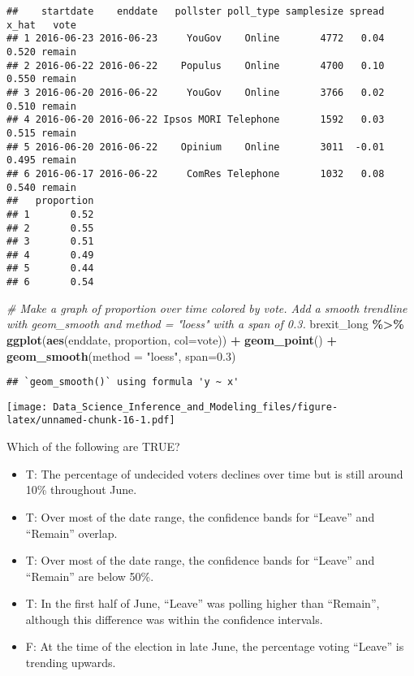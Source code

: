 \documentclass[
]{article}
\newenvironment{Shaded}{\begin{snugshade}}{\end{snugshade}}
\newcommand{\CommentTok}[1]{\textcolor[rgb]{0.56,0.35,0.01}{\textit{#1}}}
\newcommand{\DataTypeTok}[1]{\textcolor[rgb]{0.13,0.29,0.53}{#1}}
\newcommand{\FloatTok}[1]{\textcolor[rgb]{0.00,0.00,0.81}{#1}}
\newcommand{\KeywordTok}[1]{\textcolor[rgb]{0.13,0.29,0.53}{\textbf{#1}}}
\newcommand{\NormalTok}[1]{#1}
\newcommand{\OperatorTok}[1]{\textcolor[rgb]{0.81,0.36,0.00}{\textbf{#1}}}
\newcommand{\StringTok}[1]{\textcolor[rgb]{0.31,0.60,0.02}{#1}}
\providecommand{\tightlist}{%
  \setlength{\itemsep}{0pt}\setlength{\parskip}{0pt}}
\begin{document}
\begin{verbatim}
##    startdate    enddate   pollster poll_type samplesize spread x_hat   vote
## 1 2016-06-23 2016-06-23     YouGov    Online       4772   0.04 0.520 remain
## 2 2016-06-22 2016-06-22    Populus    Online       4700   0.10 0.550 remain
## 3 2016-06-20 2016-06-22     YouGov    Online       3766   0.02 0.510 remain
## 4 2016-06-20 2016-06-22 Ipsos MORI Telephone       1592   0.03 0.515 remain
## 5 2016-06-20 2016-06-22    Opinium    Online       3011  -0.01 0.495 remain
## 6 2016-06-17 2016-06-22     ComRes Telephone       1032   0.08 0.540 remain
##   proportion
## 1       0.52
## 2       0.55
## 3       0.51
## 4       0.49
## 5       0.44
## 6       0.54
\end{verbatim}

\begin{Shaded}
\begin{Highlighting}[]
\CommentTok{\# Make a graph of proportion over time colored by vote. Add a smooth trendline with geom\_smooth and method = "loess" with a span of 0.3.}
\NormalTok{brexit\_long }\OperatorTok{\%\textgreater{}\%}
\StringTok{  }\KeywordTok{ggplot}\NormalTok{(}\KeywordTok{aes}\NormalTok{(enddate, proportion, }\DataTypeTok{col=}\NormalTok{vote)) }\OperatorTok{+}
\StringTok{  }\KeywordTok{geom\_point}\NormalTok{() }\OperatorTok{+}
\StringTok{  }\KeywordTok{geom\_smooth}\NormalTok{(}\DataTypeTok{method =} \StringTok{"loess"}\NormalTok{, }\DataTypeTok{span=}\FloatTok{0.3}\NormalTok{)}
\end{Highlighting}
\end{Shaded}

\begin{verbatim}
## `geom_smooth()` using formula 'y ~ x'
\end{verbatim}

\texttt{[image: Data\_Science\_Inference\_and\_Modeling\_files/figure-latex/unnamed-chunk-16-1.pdf]}

Which of the following are TRUE?

\begin{itemize}
\tightlist
\item
  T: The percentage of undecided voters declines over time but is still
  around 10\% throughout June.
\item
  T: Over most of the date range, the confidence bands for ``Leave'' and
  ``Remain'' overlap.
\item
  T: Over most of the date range, the confidence bands for ``Leave'' and
  ``Remain'' are below 50\%.
\item
  T: In the first half of June, ``Leave'' was polling higher than
  ``Remain'', although this difference was within the confidence
  intervals.
\item
  F: At the time of the election in late June, the percentage voting
  ``Leave'' is trending upwards.
\end{itemize}
\end{document}
